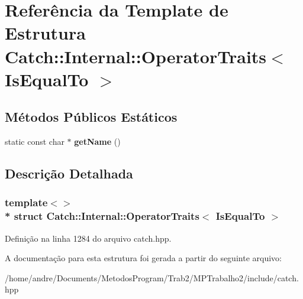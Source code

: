 \hypertarget{structCatch_1_1Internal_1_1OperatorTraits_3_01IsEqualTo_01_4}{}\section{Referência da Template de Estrutura Catch\+:\+:Internal\+:\+:Operator\+Traits$<$ Is\+Equal\+To $>$}
\label{structCatch_1_1Internal_1_1OperatorTraits_3_01IsEqualTo_01_4}
\subsection*{Métodos Públicos Estáticos}
\begin{DoxyCompactItemize}
\item 
static const char $\ast$ {\bfseries get\+Name} ()\hypertarget{structCatch_1_1Internal_1_1OperatorTraits_3_01IsEqualTo_01_4_addf03ac66f0ed83abcc037a7a327d4f1}{}\label{structCatch_1_1Internal_1_1OperatorTraits_3_01IsEqualTo_01_4_addf03ac66f0ed83abcc037a7a327d4f1}

\end{DoxyCompactItemize}


\subsection{Descrição Detalhada}
\subsubsection*{template$<$$>$\\*
struct Catch\+::\+Internal\+::\+Operator\+Traits$<$ Is\+Equal\+To $>$}



Definição na linha 1284 do arquivo catch.\+hpp.



A documentação para esta estrutura foi gerada a partir do seguinte arquivo\+:\begin{DoxyCompactItemize}
\item 
/home/andre/\+Documents/\+Metodos\+Program/\+Trab2/\+M\+P\+Trabalho2/include/catch.\+hpp\end{DoxyCompactItemize}

